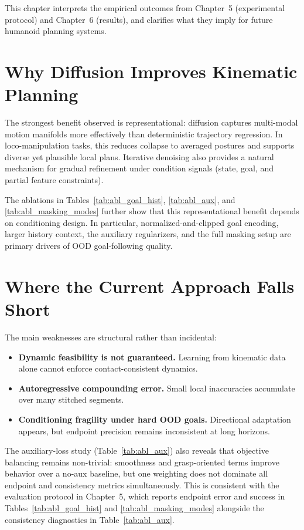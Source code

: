This chapter interprets the empirical outcomes from Chapter~5 (experimental protocol) and Chapter~6 (results), and clarifies what they imply for future humanoid planning systems.

\section{Why Diffusion Improves Kinematic Planning}

The strongest benefit observed is representational: diffusion captures multi-modal motion manifolds more effectively than deterministic trajectory regression. In loco-manipulation tasks, this reduces collapse to averaged postures and supports diverse yet plausible local plans. Iterative denoising also provides a natural mechanism for gradual refinement under condition signals (state, goal, and partial feature constraints).

The ablations in Tables~\ref{tab:abl_goal_hist}, \ref{tab:abl_aux}, and \ref{tab:abl_masking_modes} further show that this representational benefit depends on conditioning design. In particular, normalized-and-clipped goal encoding, larger history context, the auxiliary regularizers, and the full masking setup are primary drivers of OOD goal-following quality.

\section{Where the Current Approach Falls Short}

The main weaknesses are structural rather than incidental:
\begin{itemize}
	\item \textbf{Dynamic feasibility is not guaranteed.} Learning from kinematic data alone cannot enforce contact-consistent dynamics.
	\item \textbf{Autoregressive compounding error.} Small local inaccuracies accumulate over many stitched segments.
	\item \textbf{Conditioning fragility under hard OOD goals.} Directional adaptation appears, but endpoint precision remains inconsistent at long horizons.
\end{itemize}

The auxiliary-loss study (Table~\ref{tab:abl_aux}) also reveals that objective balancing remains non-trivial: smoothness and grasp-oriented terms improve behavior over a no-aux baseline, but one weighting does not dominate all endpoint and consistency metrics simultaneously. This is consistent with the evaluation protocol in Chapter~5, which reports endpoint error and success in Tables~\ref{tab:abl_goal_hist} and \ref{tab:abl_masking_modes} alongside the consistency diagnostics in Table~\ref{tab:abl_aux}.

